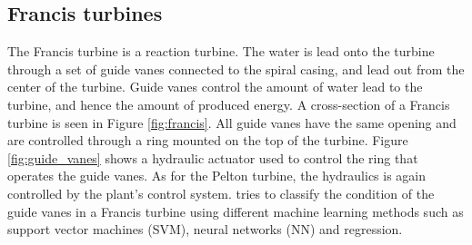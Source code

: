         
    
    \subsection{Francis turbines}\label{subsec:francis}
        The Francis turbine is a reaction turbine. The water is lead onto the turbine through a set of guide vanes connected to the spiral casing, and lead out from the center of the turbine. Guide vanes control the amount of water lead to the turbine, and hence the amount of produced energy. A cross-section of a Francis turbine is seen in Figure \ref{fig:francis}. All guide vanes have the same opening and are controlled through a ring mounted on the top of the turbine. Figure \ref{fig:guide_vanes} shows a hydraulic actuator used to control the ring that operates the guide vanes. As for the Pelton turbine, the hydraulics is again controlled by the plant's control system. \cite{Aasnes2017} tries to classify the condition of the guide vanes in a Francis turbine using different machine learning methods such as support vector machines (SVM), neural networks (NN) and regression.   
        

